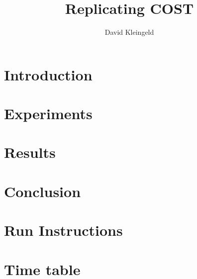 \documentclass[lang=en, hanging-titles=true]{skrapport}
\title{Replicating COST}
\author[dskleingeld@gmail.com]{David Kleingeld}
\begin{document}
\maketitle
\tableofcontents

\newpage
\section{Introduction} \label{into}

\section{Experiments} \label{exp}

\section{Results} \label{res}

\section{Conclusion} \label{concl}


\clearpage
\appendix
\section{Run Instructions}
\section{Time table}
%
\printbibliography
\end{document}
